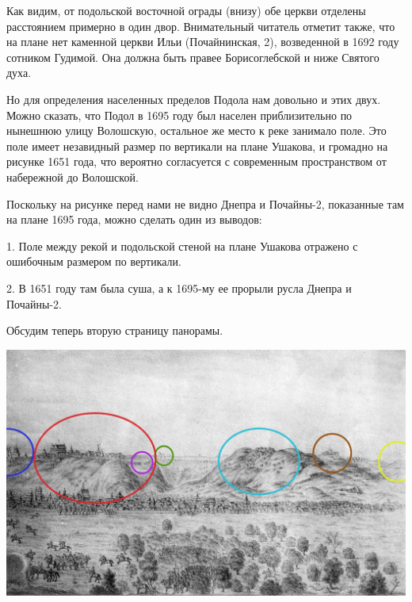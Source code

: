 Как видим, от подольской восточной ограды (внизу) обе церкви отделены расстоянием примерно в один двор. Внимательный читатель отметит также, что на плане нет каменной церкви Ильи (Почайнинская, 2), возведенной в 1692 году сотником Гудимой. Она должна быть правее Борисоглебской и ниже Святого духа.

Но для определения населенных пределов Подола нам довольно и этих двух. Можно сказать, что Подол  в 1695 году был населен приблизительно по нынешнюю улицу Волошскую, остальное же место к реке занимало поле. Это поле имеет незавидный размер по вертикали на плане Ушакова, и громадно на рисунке 1651 года, что вероятно согласуется с современным пространством от набережной до Волошской.

Поскольку на рисунке перед нами не видно Днепра и Почайны-2, показанные там на плане 1695 года, можно сделать один из выводов:

1. Поле между рекой и подольской стеной на плане Ушакова отражено с ошибочным размером по вертикали.

2. В 1651 году там была суша, а к 1695-му ее прорыли русла Днепра и Почайны-2. 



Обсудим теперь вторую страницу панорамы.

\begin{center}
\includegraphics[width=\linewidth]{chast-colebanie-osnov/gora-zamkovaya-valovaya/tabl03-2-marked.jpg}
\end{center}

